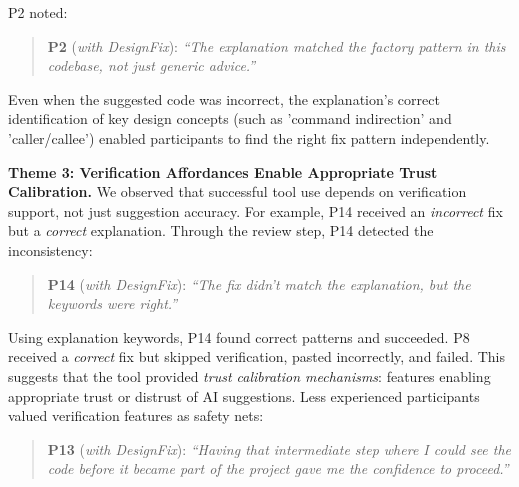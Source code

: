 \documentclass[conference]{IEEEtran}
\newcommand{\pquote}[3]{%
\vspace{2pt}
\begin{quote}\small
\textbf{#1} (\emph{#2}): \emph{``#3''}
\end{quote}
\vspace{2pt}
}
\begin{document}

P2 noted: 
\pquote{P2}{with DesignFix}{The explanation matched the factory pattern in this codebase, not just generic advice.}




Even when the suggested code was incorrect, the explanation's correct identification of key design concepts (such as 'command indirection' and 'caller/callee') enabled participants to find the right fix pattern independently. 


\textbf{Theme 3: Verification Affordances Enable Appropriate Trust Calibration.} We observed that successful tool use depends on verification support, not just suggestion accuracy. For example, P14 received an \textit{incorrect} fix 
but a \textit{correct} explanation. Through the review step, P14 detected the inconsistency:

\pquote{P14}{with DesignFix}{The fix didn't match the explanation, but the keywords were right.}


\noindent Using explanation keywords, P14 found correct patterns and succeeded. P8 received a \textit{correct} fix but skipped verification, pasted incorrectly, and failed.
This suggests that the tool provided \textit{trust calibration mechanisms}: features enabling appropriate trust or distrust of AI suggestions. Less experienced participants valued verification features as safety nets:
\pquote{P13}{with DesignFix}{Having that intermediate step where I could see the code before it became part of the project gave me the confidence to proceed.}

\end{document}
